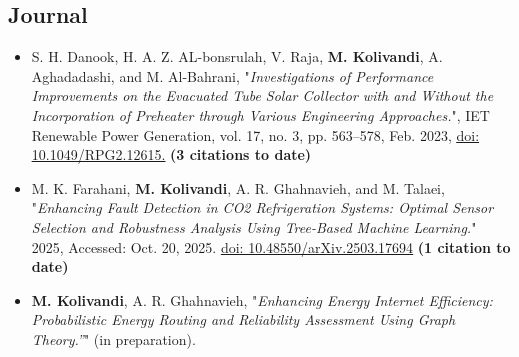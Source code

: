 \documentclass[letter,20pt]{article}
\begin{document}
\subsection*{\fontsize{10pt}{12pt}\selectfont Journal}
\begin{itemize}[noitemsep, topsep=6pt, after=\vspace{-0.5 mm},leftmargin = 3ex,rightmargin=1ex]

    \small \item \justifying S. H. Danook, H. A. Z. AL-bonsrulah, V. Raja, \textbf{M. Kolivandi}, A. Aghadadashi, and M. Al-Bahrani, "\textit{Investigations of Performance Improvements on the Evacuated Tube Solar Collector with and Without the Incorporation of Preheater through Various Engineering Approaches.}", IET Renewable Power Generation, vol. 17, no. 3, pp. 563–578, Feb. 2023, \href{https://doi.org/10.1049/rpg2.12615}{\underline{doi: 10.1049/RPG2.12615.}} \textbf{(3 citations to date)}\vspace{5pt} 
    
    \small \item \justifying  M. K. Farahani, \textbf{M. Kolivandi}, A. R. Ghahnavieh, and M. Talaei, "\textit{Enhancing Fault Detection in CO2 Refrigeration Systems: Optimal Sensor Selection and Robustness Analysis Using Tree-Based Machine Learning.}" 2025, Accessed: Oct. 20, 2025. \href{https://doi.org/10.48550/arXiv.2503.17694}{\underline{doi: 10.48550/arXiv.2503.17694}} \textbf{(1 citation to date)}\vspace{5pt}
    
    \small \item \justifying  \textbf{M. Kolivandi}, A. R. Ghahnavieh, "\textit{Enhancing Energy Internet Efficiency: Probabilistic Energy Routing and Reliability Assessment Using Graph Theory.”}" (in preparation). 
\end{itemize}
\end{document}
